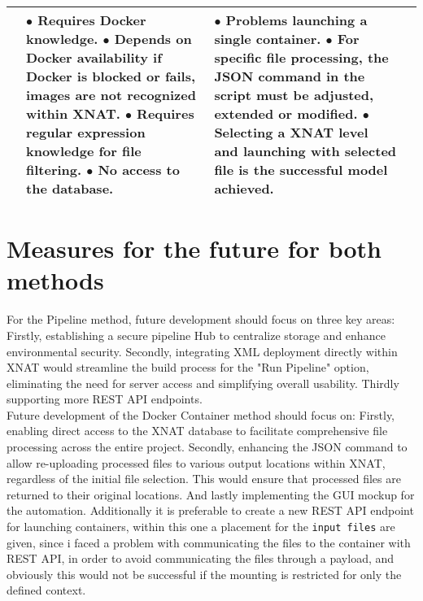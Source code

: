 \begin{table}[htbp]
\begin{tabular}{|p{1cm}|p{3cm}|p{5cm}|p{4cm}|}
{}
&
\parbox[t]{6cm}{
$\bullet$ Requires Docker knowledge. \\
$\bullet$ Depends on Docker availability \\if Docker is blocked or fails, \\images are not recognized\\ within XNAT. \\
$\bullet$ Requires regular expression\\ knowledge for file filtering. \\
$\bullet$ No access to the database. \\

}
&
\parbox[t]{4cm}{
$\bullet$ Problems launching a single container. \\
$\bullet$ For specific file processing, the JSON command in the script must be adjusted, extended or modified.\\
$\bullet$ Selecting a XNAT level and launching with selected file is the successful model achieved. 
} \\
\hline
\end{tabular}
\label{tab:docker_pipeline}
\end{table}


\section{Measures for the future for both methods}

For the Pipeline method, future development should focus on three key areas: Firstly, establishing a secure pipeline Hub to centralize storage and enhance environmental security. Secondly, integrating XML deployment directly within XNAT would streamline the build process for the "Run Pipeline" option, eliminating the need for server access and simplifying overall usability. Thirdly supporting more REST API endpoints.\\
Future development of the Docker Container method should focus on: Firstly, enabling direct access to the XNAT database to facilitate comprehensive file processing across the entire project. Secondly, enhancing the JSON command to allow re-uploading processed files to various output locations within XNAT, regardless of the initial file selection. This would ensure that processed files are returned to their original locations. And lastly implementing the GUI mockup for the automation.
Additionally it is preferable to create a new REST API endpoint for launching containers, within this one a placement for the \texttt{input files} are given, since i faced a problem with communicating the files to the container with REST API, in order to avoid communicating the files through a payload, and obviously this would not be successful if the mounting is restricted for only the defined context. 


